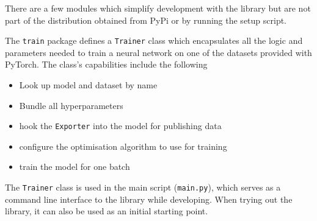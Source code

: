 There are a few modules which simplify development with the library but are not
part of the distribution obtained from PyPi or by running the setup script.

The \texttt{train} package defines a \texttt{Trainer} class which encapsulates
all the logic and parameters needed to train a neural network on one of the
datasets provided with PyTorch. The class's capabilities include the following

\begin{itemize}
    \item
        Look up model and dataset by name
    \item
        Bundle all hyperparameters
    \item
        hook the \texttt{Exporter} into the model for
        publishing data
    \item
        configure the optimisation algorithm to use for training
    \item
        train the model for one batch
\end{itemize}

The \texttt{Trainer} class is used in the main script (\texttt{main.py}), which
serves as a command line interface to the library while developing. When trying
out the library, it can also be used as an initial starting point.

